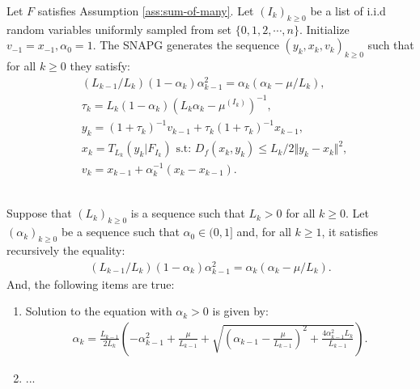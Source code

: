 \documentclass[12pt]{article}
\begin{document}
        \begin{definition}[SNAPG-V2]\label{def:snapg-v2}
            Let $F$ satisfies Assumption \ref{ass:sum-of-many}. 
            Let $(I_k)_{k \ge 0}$ be a list of i.i.d random variables uniformly sampled from set $\{0, 1, 2, \cdots, n\}$. 
            Initialize $v_{-1} = x_{-1}, \alpha_0 = 1$. 
            The SNAPG generates the sequence $(y_k, x_k, v_k)_{k \ge 0}$ such that for all $k \ge 0$ they satisfy: 
            \begin{align*}
                & (L_{k - 1}/L_k)(1 - \alpha_{k})\alpha_{k - 1}^2 = \alpha_{k}\left(\alpha_{k} - \mu/L_k\right), \\
                & \tau_k = L_k(1 - \alpha_k)\left(L_k \alpha_k - \mu^{(I_k)}\right)^{-1}, \\
                & y_k = (1 + \tau_k)^{-1}v_{k - 1} + \tau_k(1 + \tau_k)^{-1}x_{k - 1}, \\
                & x_k =  T_{L_k}(y_k | F_{I_k}) \text{ s.t: } D_f(x_k, y_k) \le L_k/2\Vert y_k - x_k\Vert^2, \\
                & v_k = x_{k - 1} + \alpha_k^{-1}(x_k - x_{k - 1}). 
            \end{align*}
        \end{definition}
        \begin{lemma}\;\label{lemma:snapg-v2-seq-range}\\
            Suppose that $(L_k)_{k \ge 0}$ is a sequence such that $L_k > 0$ for all $k \ge 0$. 
            Let $(\alpha_k)_{k \ge 0}$ be a sequence such that $\alpha_0 \in (0, 1]$ and, for all $k \ge 1$, it satisfies recursively the equality: 
            \begin{align*}
                (L_{k - 1}/L_k)(1 - \alpha_{k})\alpha_{k - 1}^2 = \alpha_{k}\left(\alpha_{k} - \mu/L_k\right). 
            \end{align*}
            And, the following items are true: 
            \begin{enumerate}
                \item Solution to the equation with $\alpha_k > 0$ is given by: 
                \begin{align*}
                    \alpha_k = \frac{L_{k - 1}}{2L_k} \left(
                        - \alpha_{k - 1}^2 + \frac{\mu}{L_{k - 1}}
                        + \sqrt{
                            \left(
                                \alpha_{k - 1} - \frac{\mu}{L_{k - 1}}
                            \right)^2
                            + \frac{4\alpha_{k - 1}^2L_k}{L_{k - 1}}
                        }
                    \right). 
                \end{align*}
                \item ... 
            \end{enumerate}
        \end{lemma}
\end{document}
